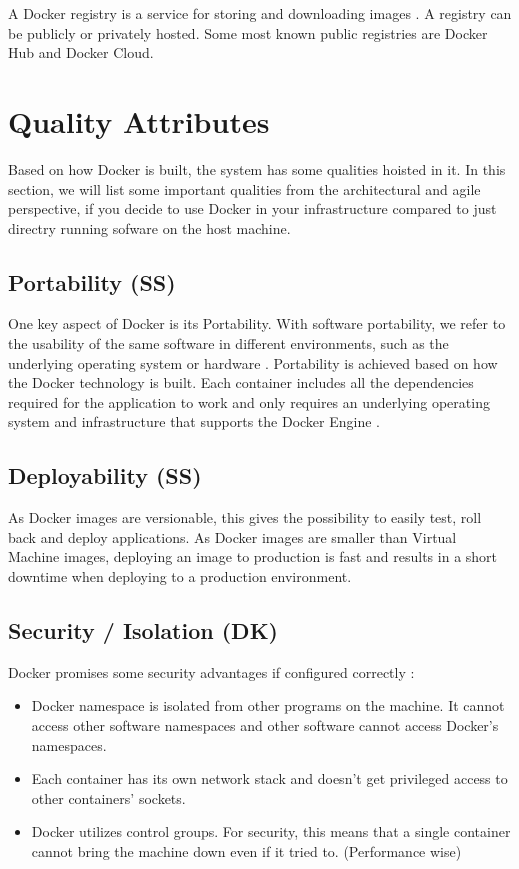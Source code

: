 \documentclass[fleqn,12pt]{olplainarticle}
\begin{document}
A Docker registry is a service for storing and downloading images \citep{aquasec:docker_architecture}. A registry can be publicly or privately hosted. Some most known public registries are Docker Hub and Docker Cloud.

\section{Quality Attributes}


Based on how Docker is built, the system has some qualities hoisted in it. In this section, we will list some important qualities from the architectural and agile perspective, if you decide to use Docker in your infrastructure compared to just directry running sofware on the host machine. 

\subsection{Portability (SS)}
One key aspect of Docker is its Portability. With software portability, we refer to the usability of the same software in different environments, such as the underlying operating system or hardware \citep{wiki:Software_portability}. Portability is achieved based on how the Docker technology is built. Each container includes all the dependencies required for the application to work and only requires an underlying operating system and infrastructure that supports the Docker Engine \citep{hy:DevOps_with_Docker}.

\subsection{Deployability (SS)}
As Docker images are versionable, this gives the possibility to easily test, roll back and deploy applications\citep{hentsu:benefits}. As Docker images are smaller than Virtual Machine images, deploying an image to production is fast and results in a short downtime when deploying to a production environment. 

\subsection{Security / Isolation (DK)}
Docker promises some security advantages if configured correctly \citep{docker:security}:
\begin{itemize}
    \item  Docker namespace is isolated from other programs on the machine. It cannot access other software namespaces and other software cannot access Docker's namespaces. 
    \item Each container has its own network stack and doesn't get privileged access to other containers' sockets.
    \item Docker utilizes control groups. For security, this means that a single container cannot bring the machine down even if it tried to. (Performance wise)
\end{itemize}
\end{document}
